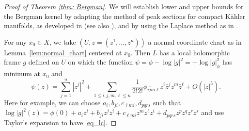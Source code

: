 \documentclass[a4paper, 11pt]{amsart}
\theoremstyle{plain}
\numberwithin{equation}{section} %
\numberwithin{figure}{section} %
\theoremstyle{plain}
\theoremstyle{plain}
\theoremstyle{plain}
\theoremstyle{plain}
\theoremstyle{remark}
\theoremstyle{definition}
\theoremstyle{definition}
\begin{document}
\begin{proof}[Proof of Theorem \ref{thm: Bergman}]
We will establish lower and upper bounds for the Bergman kernel by adapting the method of peak sections for compact K\"ahler manifolds, as developed in \cite{Tian90-metrics-algebraic} (see also \cite{Ruan_1998,Lu00-expansion, SongWeinkove10-negativecurvature}), and by using the Laplace method as  in \cite{donaldson-2009-notes,charles15-bergmankernel}.
\medskip

For any $x_0\in X$, we take  $(U, z=(z^1,\ldots,z^n))$ a normal coordinate chart as in Lemma~\ref{lem:normal_chart} centered at $x_0$. 
Then $L$ has a local holomorphic frame $g$ defined on $U$ on which the function $\psi=\phi -\log |g|^2 = -\log|g|^2_{\phi}$  has minimum at $x_0$  and 
\begin{equation}\label{eq_lc}
    \psi(z)=  \sum_{j=1}^n |z^j|^2+\sum_{1\leq i,j,m,\ell\leq n}{\frac{1}{2!2!}}\phi_{i\bar j m\bar \ell} z^i \bar z^{ j} z^{m}\bar z^{ \ell}+O(|z|^5).
\end{equation}
Here for example, we  can choose $a_i, b_{ji}, c_{\ell m i}, d_{pqrs}$ such that $\log |g|^2 (z)= \phi(0)+ a_i z^i+ b_{ji} z^jz^i +c_{\ell m i}z^mz^\ell z^i + d_{pqrs}z^pz^qz^rz^s$ and use Taylor's expansion  to have \eqref{eq_lc}. 

\end{proof}
\end{document}
